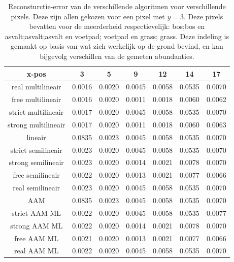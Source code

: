 \documentclass[12pt]{report}
\begin{document}
\begin{table}
\centering
\begin{tabular}{|c|c|c|c|c|c|c|}
\hline
x-pos&3 & 5 & 9 & 12 & 14 & 17 \\
\hline
real multilineair  & 0.0016 & 0.0020 & 0.0045 & 0.0058 & 0.0535 & 0.0070 \\
\hline
free multilineair  & 0.0016 & 0.0020 & 0.0011 & 0.0018 & 0.0060 & 0.0062 \\
\hline
strict multilineair  & 0.0017 & 0.0020 & 0.0045 & 0.0058 & 0.0535 & 0.0070 \\
\hline
strong multilineair  & 0.0017 & 0.0020 & 0.0011 & 0.0018 & 0.0060 & 0.0063 \\
\hline
lineair  & 0.0835 & 0.0023 & 0.0045 & 0.0058 & 0.0535 & 0.0070 \\
\hline
strict semilineair  & 0.0023 & 0.0020 & 0.0045 & 0.0058 & 0.0535 & 0.0070 \\
\hline
strong semilineair  & 0.0023 & 0.0020 & 0.0014 & 0.0021 & 0.0078 & 0.0070 \\
\hline
free semilineair  & 0.0022 & 0.0020 & 0.0013 & 0.0021 & 0.0077 & 0.0066 \\
\hline
real semilineair  & 0.0023 & 0.0020 & 0.0045 & 0.0058 & 0.0535 & 0.0070 \\
\hline
AAM  & 0.0835 & 0.0023 & 0.0045 & 0.0058 & 0.0535 & 0.0070 \\
\hline
strict AAM ML  & 0.0022 & 0.0020 & 0.0045 & 0.0058 & 0.0535 & 0.0077 \\
\hline
strong AAM ML  & 0.0022 & 0.0020 & 0.0014 & 0.0021 & 0.0078 & 0.0070 \\
\hline
free AAM ML  & 0.0021 & 0.0020 & 0.0013 & 0.0021 & 0.0077 & 0.0066 \\
\hline
real AAM ML  & 0.0022 & 0.0020 & 0.0045 & 0.0058 & 0.0535 & 0.0070 \\
\hline
\end{tabular}
\caption{Reconsturctie-error van de verschillende algoritmen voor verschillende pixels. Deze zijn allen gekozen voor een pixel met $y=3$. Deze pixels bevatten voor de meerderheid respectievelijk: bos;bos en asvalt;asvalt;asvalt en voetpad; voetpad en grass; grass. Deze indeling is gemaakt op basis van wat zich werkelijk op de grond bevind, en kan bijgevolg verschillen van de gemeten abundanties.
\label{table:erros}}
\end{table}
\end{document}
